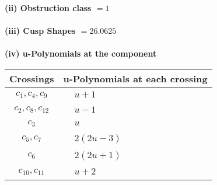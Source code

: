 \documentclass[1p]{elsarticle_modified}
\theoremstyle{definition}
\begin{document}
\flushleft \textbf{(ii) Obstruction class $= 1$}\\~\\
\flushleft \textbf{(iii) Cusp Shapes $= 26.0625$}\\~\\
\newpage\renewcommand{\arraystretch}{1}
\flushleft \textbf{(iv) u-Polynomials at the component}\newline \\
\begin{tabular}{m{50pt}|m{274pt}}
Crossings & \hspace{64pt}u-Polynomials at each crossing \\
\hline $$\begin{aligned}c_{1},c_{4},c_{9}\end{aligned}$$&$\begin{aligned}
&u+1
\end{aligned}$\\
\hline $$\begin{aligned}c_{2},c_{8},c_{12}\end{aligned}$$&$\begin{aligned}
&u-1
\end{aligned}$\\
\hline $$\begin{aligned}c_{3}\end{aligned}$$&$\begin{aligned}
&u
\end{aligned}$\\
\hline $$\begin{aligned}c_{5},c_{7}\end{aligned}$$&$\begin{aligned}
&2(2 u-3)
\end{aligned}$\\
\hline $$\begin{aligned}c_{6}\end{aligned}$$&$\begin{aligned}
&2(2 u+1)
\end{aligned}$\\
\hline $$\begin{aligned}c_{10},c_{11}\end{aligned}$$&$\begin{aligned}
&u+2
\end{aligned}$\\
\hline
\end{tabular}\\~\\
\newpage\renewcommand{\arraystretch}{1}
\end{document}
